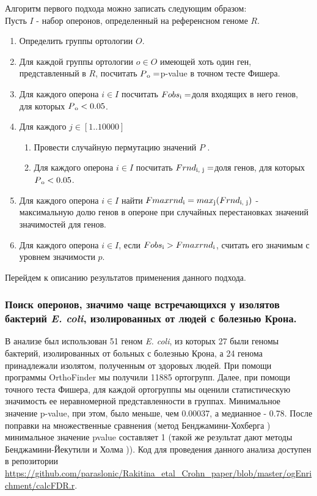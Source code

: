 Алгоритм первого подхода можно записать следующим образом:\\
Пусть $I$ - набор оперонов, определенный на референсном геноме $R$.
\begin{enumerate} 
  \item Определить группы ортологии $O$.
  \item Для каждой группы ортологии $o \in O $ имеющей хоть один ген, представленный в $R$, посчитать $P\textsubscript{o} = $p-value в точном тесте Фишера.
  \item Для каждого оперона $i \in I$ посчитать $Fobs\textsubscript{i} = $доля входящих в него генов, для которых $P\textsubscript{o} < 0.05$.
  \item Для каждого $j \in [1..10000]$
  	\begin{enumerate} 
        \item Провести случайную пермутацию значений $P$ .
        \item Для каждого оперона $i \in I$ посчитать $Frnd\textsubscript{i, j} = $доля генов, для которых $P\textsubscript{o} < 0.05$.
  	\end{enumerate} 
  \item Для каждого оперона $i \in I$ найти $Fmaxrnd\textsubscript{i}=max\textsubscript{j}(Frnd\textsubscript{i, j})$ - максимальную долю генов в опероне при случайных перестановках значений значимостей для генов.
  \item Для каждого оперона $i \in I$, если $Fobs\textsubscript{i}>Fmaxrnd\textsubscript{i}$, считать его значимым с уровнем значимости $p{}$.
\end{enumerate}

Перейдем к описанию результатов применения данного подхода.

\subsubsection{Поиск оперонов, значимо чаще встречающихся у изолятов бактерий \textit{E. coli}, изолированных от людей с болезнью Крона.}
В анализе был использован 51 геном \textit{E. coli}, из которых 27 были геномы бактерий, изолированных от больных с болезнью Крона, а 24 генома принадлежали изолятом, полученным от здоровых людей. При помощи программы OrthoFinder \cite{emms2015orthofinder} мы получили 11885 ортогрупп. Далее, при помощи точного теста Фишера, для каждой ортогруппы мы оценили статистическую значимость ее неравномерной представленности в группах. Минимальное значение p-value, при этом, было меньше, чем 0.00037, а медианное - 0.78. После поправки на множественные сравнения (метод Бенджамини-Хохберга \cite{benjamini1995controlling}) минимальное значение p\-value составляет 1 (такой же результат дают методы Бенджамини-Йекутили \cite{benjamini2001control} и Холма \cite{holm1979simple})). Код для проведения данного анализа доступен в репозитории \url{https://github.com/paraslonic/Rakitina_etal_Crohn_paper/blob/master/ogEnrichment/calcFDR.r}. 

